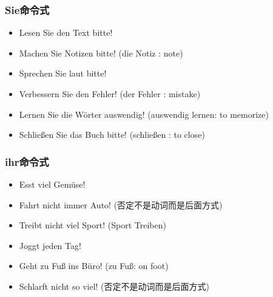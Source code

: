 \subsubsection{Sie命令式}
\begin{itemize}
    \item Lesen Sie den Text bitte!
    \item Machen Sie Notizen bitte! (die Notiz \sqr[color=yellow]: note)
    \item Sprechen Sie laut bitte!
    \item Verbessern Sie den Fehler! (der Fehler \sqr[color=green]: mistake)
    \item Lernen Sie die Wörter auswendig! (auswendig lernen: to memorize)
    \item Schließen Sie das Buch bitte! (schließen \cir[color=gray]: to close)
\end{itemize}
\subsubsection{ihr命令式}
\begin{itemize}
    \item Esst viel Gemüse!
    \item Fahrt nicht immer Auto! (否定不是动词而是后面方式)
    \item Treibt nicht viel Sport! (Sport Treiben)
    \item Joggt jeden Tag!
    \item Geht zu Fuß ins Büro! (zu Fuß: on foot)
    \item Schlarft nicht so viel! (否定不是动词而是后面方式)
\end{itemize}

